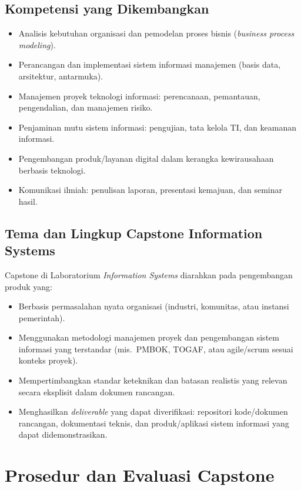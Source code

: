 \documentclass[12pt,a4paper]{report}
\begin{document}
\section{Kompetensi yang Dikembangkan}
\begin{itemize}
\item Analisis kebutuhan organisasi dan pemodelan proses bisnis (\emph{business process modeling}).
\item Perancangan dan implementasi sistem informasi manajemen (basis data, arsitektur, antarmuka).
\item Manajemen proyek teknologi informasi: perencanaan, pemantauan, pengendalian, dan manajemen risiko.
\item Penjaminan mutu sistem informasi: pengujian, tata kelola TI, dan keamanan informasi.
\item Pengembangan produk/layanan digital dalam kerangka kewirausahaan berbasis teknologi.
\item Komunikasi ilmiah: penulisan laporan, presentasi kemajuan, dan seminar hasil.
\end{itemize}

\section{Tema dan Lingkup Capstone Information Systems}
Capstone di Laboratorium \emph{Information Systems} diarahkan pada pengembangan produk yang:
\begin{itemize}
\item Berbasis permasalahan nyata organisasi (industri, komunitas, atau instansi pemerintah).
\item Menggunakan metodologi manajemen proyek dan pengembangan sistem informasi yang terstandar (mis.\ PMBOK, TOGAF, atau agile/scrum sesuai konteks proyek).
\item Mempertimbangkan standar keteknikan dan batasan realistis yang relevan secara eksplisit dalam dokumen rancangan.
\item Menghasilkan \emph{deliverable} yang dapat diverifikasi: repositori kode/dokumen rancangan, dokumentasi teknis, dan produk/aplikasi sistem informasi yang dapat didemonstrasikan.
\end{itemize}

\chapter{Prosedur dan Evaluasi Capstone}
\end{document}
